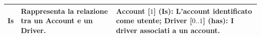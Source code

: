 \begin{tabularx}{\textwidth}{YYY}
  Is &
  \begin{minipage}[c]{\linewidth}
    \vspace{0.5cm}
    Rappresenta la relazione tra un \textbf{Account} e un \textbf{Driver}. \newline
  \end{minipage} &
  \begin{minipage}[c]{\linewidth}
    \vspace{0.5cm}
    \textbf{Account} [\(1\)] (Is):  L'account identificato come utente; \newline
    \textbf{Driver} [\(0..1\)] (has): I driver associati a un account. \newline
  \end{minipage} \\
  \bottomrule
\end{tabularx}

\newpage


